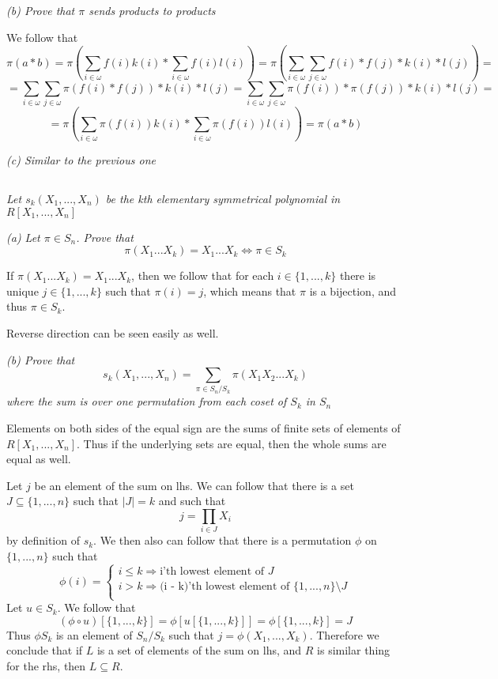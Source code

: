 \documentclass[11pt,oneside,titlepage]{book}
\DeclareMathOperator \lra {\Leftrightarrow}
\DeclareMathOperator \ra {\Rightarrow}
\newcommand{\set}[1]{\{ #1 \}}
\begin{document}
\textit{(b) Prove that $\pi$ sends products to products}

We follow that
$$\pi(a * b) = \pi(\sum_{i \in \omega}{f(i)k(i)} * \sum_{i \in \omega}{f(i)l(i)}) =
\pi(\sum_{i \in \omega}{\sum_{j \in \omega}{f(i) * f(j) * k(i) * l(j)}}) = $$
$$ = \sum_{i \in \omega}{\sum_{j \in \omega}{\pi(f(i) * f(j)) * k(i) * l(j)}} =
\sum_{i \in \omega}{\sum_{j \in \omega}{\pi(f(i)) * \pi(f(j)) * k(i) * l(j)}} =$$
$$= 
\pi(\sum_{i \in \omega}{\pi(f(i))k(i)} * \sum_{i \in \omega}{\pi(f(i))l(i)}) =
\pi(a * b)$$

\textit{(c) Similar to the previous one}

\subsection{}

\textit{Let $s_k(X_1, ..., X_n)$ be the kth elementary symmetrical
  polynomial in $R[X_1, ..., X_n]$}

\textit{(a) Let $\pi \in S_n$. Prove that
  $$\pi(X_1 ... X_k)  = X_1 ... X_k \lra \pi \in S_k$$}

If $\pi(X_1 ... X_k) = X_1 ... X_k$, then we follow that for each $i
\in \set{1, ..., k}$ there is unique $j \in \set{1, ..., k}$ such that
$\pi(i) = j$, which means that $\pi$ is a bijection, and thus $\pi \in S_k$.

Reverse direction can be seen easily as well.

\textit{(b) Prove that
  $$s_k(X_1, ..., X_n) = \sum_{\pi \in S_n / S_k}{\pi(X_1 X_2 ... X_k)}$$
  where the sum is over one permutation from each coset of $S_k$ in $S_n$
}

Elements on both sides of the equal sign are the sums of finite
sets of elements of $R[X_1, ..., X_n]$. Thus if the underlying sets
are equal, then the whole sums are equal as well. 

Let $j$ be an element of the sum on lhs. We can follow that there is
a set $J \subseteq \set{1, ..., n} $ such that $|J| = k$
and such that
$$j = \prod_{i \in J}{X_{i}}$$
by definition of $s_k$.  We then also can follow that there is a
permutation $\phi$ on $\set{1, ..., n}$ such that
$$\phi(i) =
\begin{cases}
  i \leq k \ra \text{i'th lowest element of } J \\
  i > k \ra \text{(i - k)'th lowest element of } \set{1, ..., n} \setminus J \\  
\end{cases}
$$
Let $u \in S_k$. We follow that
$$(\phi \circ u)[\set{1, ..., k}] =  \phi[u[\set{1, ..., k}]] = \phi[\set{1, ..., k}] = J$$
Thus $\phi S_k$ is an element of $S_n/S_k$ such that $j = \phi(X_1, ..., X_k)$.
Therefore we conclude that if $L$ is a set of elements of the sum on lhs, and $R$
is similar thing for the rhs, then $L \subseteq R$.
\end{document}
